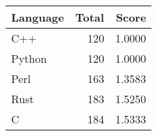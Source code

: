 \centering
\begin{tabular}{|l|r|r|}
    \hline
    Language & Total & Score \\
    \hline
    C++ & 120 & 1.0000 \\
    Python & 120 & 1.0000 \\
    Perl & 163 & 1.3583 \\
    Rust & 183 & 1.5250 \\
    C & 184 & 1.5333 \\
    \hline
\end{tabular}
